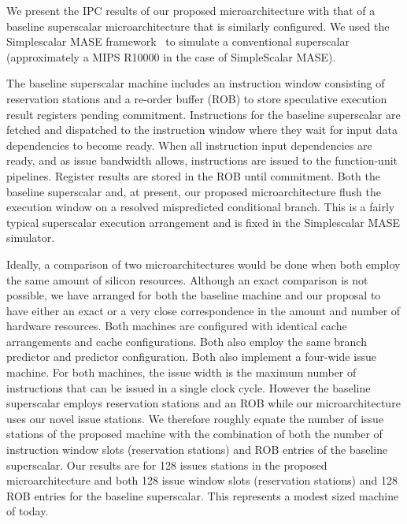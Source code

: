 \documentclass[10pt,dvips]{article}
\begin{document}
We present the IPC results of our proposed
microarchitecture with that of a baseline 
superscalar microarchitecture that is similarly configured.
We used the 
Simplescalar MASE framework~\cite{Austin97}
to simulate a conventional superscalar (approximately a MIPS R10000
in the case of SimpleScalar MASE).

The baseline superscalar machine includes an instruction
window consisting of reservation stations and a re-order buffer (ROB)
to store speculative execution result registers pending commitment.
Instructions for the baseline superscalar are fetched and dispatched
to the instruction window where they wait for input data dependencies to
become ready.  When all instruction input dependencies are ready,
and as issue bandwidth allows, instructions are issued to the
function-unit pipelines.  Register results are stored in the ROB
until commitment.  
Both the baseline superscalar and, at present, our proposed
microarchitecture flush the execution window on a resolved mispredicted 
conditional branch.
This is a fairly typical superscalar execution
arrangement and is fixed in the Simplescalar MASE simulator.

Ideally, a comparison of two microarchitectures would be
done when both employ the same amount of silicon resources.
Although an exact comparison is not possible, we have arranged
for both the baseline machine and our proposal to have either an
exact or a very
close correspondence in the amount and number of hardware resources.
Both machines are configured with identical
cache arrangements and cache configurations.
Both also employ the same branch predictor and predictor configuration.
Both also implement a four-wide issue machine.
For both machines, the issue width is the maximum number of
instructions that can be issued in a single clock cycle.
However the baseline superscalar employs reservation stations and
an ROB while our microarchitecture uses our novel issue stations.
We therefore roughly equate the number of issue stations of
the proposed machine with the combination of both the
number of instruction window slots (reservation stations)
and ROB entries of the baseline superscalar.
Our results are for 128 issues stations in the proposed 
microarchitecture and both 128 issue window slots (reservation stations)
and 128 ROB entries for the baseline superscalar.
This represents a modest sized machine of today.
\end{document}
